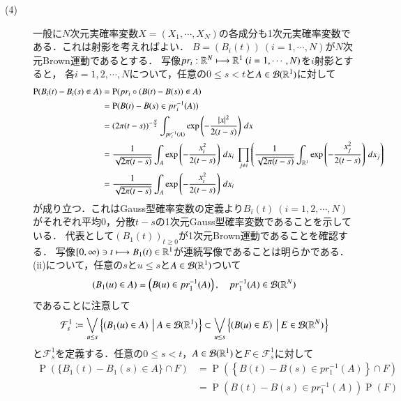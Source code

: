 \begin{prf}
\begin{description}
	\item[(4)] 
		一般に$N$次元実確率変数$X = (X_1, \cdots, X_N)$の各成分も1次元実確率変数である．これは射影を考えればよい．
		$B = (B_i(t))\ (i=1,\cdots,N)$が$N$次元Brown運動であるとする．
		写像$pr_i : \R^N \longmapsto \R^1\ (i=1,\cdots,N)$を$i$射影とすると，
		各$i=1,2,\cdots,N$について，任意の$0 \leq s < t$と$A \in \mathcal{B}(\mathbb{R}^1)$に対して
		\begin{align}
			\operatorname{P}(B_i(t) - B_i(s) \in A) 
			&= \operatorname{P}(pr_i \circ (B(t) - B(s)) \in A) \\
			&= \operatorname{P}(B(t) - B(s) \in pr_i^{-1}(A)) \\
			&= (2 \pi (t-s))^{-\frac{N}{2}} \int_{pr_i^{-1}(A)} \mathrm{exp} \left( -\frac{|x|^2}{2(t-s)} \right)\, dx \\
			&= \frac{1}{\sqrt{2 \pi (t-s)}} \int_{A} \mathrm{exp} \left( -\frac{x_i^2}{2(t-s)} \right)\, dx_i 
				\ \prod_{j \neq i} \left(\frac{1}{\sqrt{2 \pi (t-s)}} \int_{\mathbb{R}^1} \mathrm{exp} \left( -\frac{x_j^2}{2(t-s)} \right)\, dx_j \right) \\
			&= \frac{1}{\sqrt{2 \pi (t-s)}} \int_{A} \mathrm{exp} \left( -\frac{x_i^2}{2(t-s)} \right)\, dx_i 
		\end{align}
		が成り立つ．これはGauss型確率変数の定義より$B_i(t)\ (i=1,2,\cdots,N)$がそれぞれ平均0，分散$t-s$の1次元Gauss型確率変数であることを示している．
		代表として$(B_1(t))_{t \geq 0}$が1次元Brown運動であることを確認する．
		写像$[0,\infty) \ni t \longmapsto B_1(t) \in \mathbb{R}^1$が連続写像であることは明らかである．
		(ii)について，任意の$s$と$u \leq s$と$A \in \mathcal{B}(\mathbb{R}^1)$ついて
		\begin{align}
			(B_1(u) \in A) = \left(B(u) \in pr_1^{-1}(A)\right), \quad pr_1^{-1}(A) \in \mathcal{B}(\mathbb{R}^N)
		\end{align}
		であることに注意して
		\begin{align}
			\mathcal{F}_s^1 \coloneqq \bigvee_{u \leq s} \left\{ (B_1(u) \in A)\ \left|\ A \in \mathcal{B}(\mathbb{R}^1) \right.\right\}
			\subset \bigvee_{u \leq s} \left\{ (B(u) \in E)\ \left|\ E \in \mathcal{B}(\mathbb{R}^N) \right.\right\}
		\end{align}
		と$\mathcal{F}_s^1$を定義する．任意の$0 \leq s < t$，$A \in \mathcal{B}(\mathbb{R}^1)$と$F \in \mathcal{F}_s^1$に対して
		\begin{align}
			\operatorname{P}(\{B_1(t) - B_1(s) \in A\} \cap F)
			&= \operatorname{P}\left( \left\{ B(t) - B(s) \in pr_1^{-1}(A)\right\} \cap F\right) \\
			&= \operatorname{P}\left( B(t) - B(s) \in pr_1^{-1}(A)\right) \operatorname{P}(F) \\

\end{align}
\end{description}
\end{prf}
